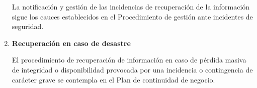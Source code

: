 \begin{enumerate}[label=\alph*)]
La notificación y gestión de las incidencias de recuperación de la información sigue los cauces establecidos en el Procedimiento de gestión ante incidentes de seguridad.

\item \textbf{Recuperación en caso de desastre}

El procedimiento de recuperación de información en caso de pérdida masiva de integridad o disponibilidad provocada por una incidencia o contingencia de carácter grave se contempla en el Plan de continuidad de negocio.

\end{enumerate}
